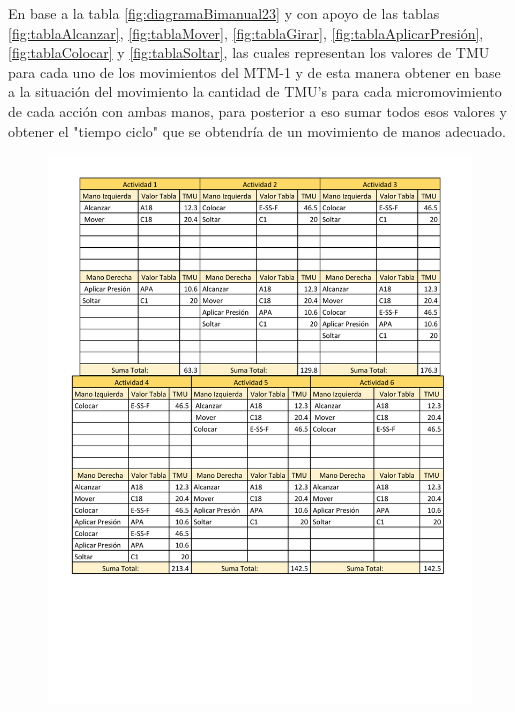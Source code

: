     En base a la tabla \ref{fig:diagramaBimanual23}  y con apoyo de las tablas \ref{fig:tablaAlcanzar}, \ref{fig:tablaMover}, \ref{fig:tablaGirar}, \ref{fig:tablaAplicarPresión}, \ref{fig:tablaColocar} y \ref{fig:tablaSoltar}, las cuales representan los valores de TMU para cada uno de los movimientos del MTM-1 y de esta manera obtener en base a la situación del movimiento la cantidad de TMU's para cada micromovimiento de cada acción con ambas manos, para posterior a eso sumar todos esos valores y obtener el "tiempo ciclo" que se obtendría de un movimiento de manos adecuado.
        \begin{figure}[H]
        \centering
        \includegraphics[trim = {5mm 60mm 1mm 10mm},clip,scale=0.3]{19/Img/tablaTMU1.pdf}
        \newpage
        \label{fig:tablaTMU1}    
    \end{figure}
